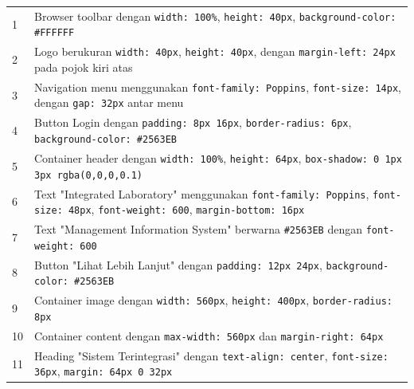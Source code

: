 \begin{enumerate}
{\begin{longtable}{p{4cm} p{9cm}}
		      1                                & Browser toolbar dengan \texttt{width: 100\%}, \texttt{height: 40px}, \texttt{background-color: \#FFFFFF}                                                  \\
		      2                                & Logo berukuran \texttt{width: 40px}, \texttt{height: 40px}, dengan \texttt{margin-left: 24px} pada pojok kiri atas                                        \\
		      3                                & Navigation menu menggunakan \texttt{font-family: Poppins}, \texttt{font-size: 14px}, dengan \texttt{gap: 32px} antar menu                                 \\
		      4                                & Button Login dengan \texttt{padding: 8px 16px}, \texttt{border-radius: 6px}, \texttt{background-color: \#2563EB}                                          \\
		      5                                & Container header dengan \texttt{width: 100\%}, \texttt{height: 64px}, \texttt{box-shadow: 0 1px 3px rgba(0,0,0,0.1)}                                      \\
		      6                                & Text "Integrated Laboratory" menggunakan \texttt{font-family: Poppins}, \texttt{font-size: 48px}, \texttt{font-weight: 600}, \texttt{margin-bottom: 16px} \\
		      7                                & Text "Management Information System" berwarna \texttt{\#2563EB} dengan \texttt{font-weight: 600}                                                          \\
		      8                                & Button "Lihat Lebih Lanjut" dengan \texttt{padding: 12px 24px}, \texttt{background-color: \#2563EB}                                                       \\
		      9                                & Container image dengan \texttt{width: 560px}, \texttt{height: 400px}, \texttt{border-radius: 8px}                                                         \\
		      10                               & Container content dengan \texttt{max-width: 560px} dan \texttt{margin-right: 64px}                                                                        \\
		      11                               & Heading "Sistem Terintegrasi" dengan \texttt{text-align: center}, \texttt{font-size: 36px}, \texttt{margin: 64px 0 32px}                                  \\

\end{longtable}}
\end{enumerate}
